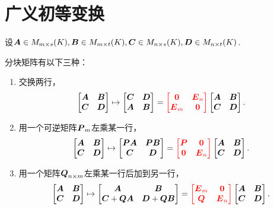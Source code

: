 \section{广义初等变换}
设\(\boldsymbol{A} \in M_{m \times s}(K),
\boldsymbol{B} \in M_{m \times t}(K),
\boldsymbol{C} \in M_{n \times s}(K),
\boldsymbol{D} \in M_{n \times t}(K)\).

\def\OriginalMatrix{
	\begin{bmatrix}
		\vb{A} & \vb{B} \\
		\vb{C} & \vb{D}
	\end{bmatrix}
}
分块矩阵有以下三种：
\begin{enumerate}
	\item 交换两行，\begin{equation*}
		\OriginalMatrix
		\mapsto \begin{bmatrix}
			\vb{C} & \vb{D} \\
			\vb{A} & \vb{B}
		\end{bmatrix}
		= {\color{red} \begin{bmatrix}
			\vb0 & \vb{E}_n \\
			\vb{E}_m & \vb0
		\end{bmatrix}}
		\OriginalMatrix.
	\end{equation*}

	\item 用一个可逆矩阵\(\boldsymbol{P}_m\)左乘某一行，\begin{equation*}
		\OriginalMatrix
		\mapsto \begin{bmatrix}
			\vb{P}\vb{A} & \vb{P}\vb{B} \\
			\vb{C} & \vb{D}
		\end{bmatrix}
		= {\color{red} \begin{bmatrix}
			\vb{P} & \vb0 \\
			\vb0 & \vb{E}_n
		\end{bmatrix}}
		\OriginalMatrix.
	\end{equation*}

	\item 用一个矩阵\(\boldsymbol{Q}_{n \times m}\)左乘某一行后加到另一行，\begin{equation*}
		\OriginalMatrix
		\mapsto \begin{bmatrix}
		\vb{A} & \vb{B} \\
		\vb{C}+\vb{Q}\vb{A} & \vb{D}+\vb{Q}\vb{B}
		\end{bmatrix}
		= {\color{red} \begin{bmatrix}
		\vb{E}_m & \vb0 \\
		\vb{Q} & \vb{E}_n
		\end{bmatrix}}
		\OriginalMatrix.
	\end{equation*}
\end{enumerate}

